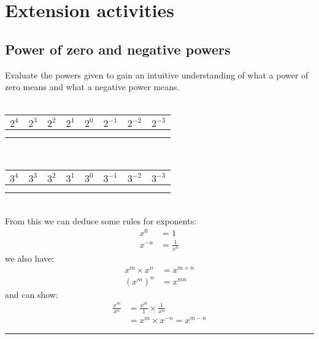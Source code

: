\documentclass[a4paper,12pt]{article}
\renewcommand{\arraystretch}{1.5}
\newcommand\questionend{
	\rule[0pt]{17cm}{0.5pt}\vspace{-0.5cm}\\
}
\begin{document}
	\section*{Extension activities}
	\subsection*{Power of zero and negative powers}
	Evaluate the powers given to gain an intuitive understanding of what a power of zero means and what a negative power means.\\\\
	\renewcommand{\arraystretch}{1.5}
		\begin{tabular}{*{8}{|C{1.75cm}}|}\hline
		$2^4$&$2^3$&$2^2$&$2^1$&$2^0$&$2^{-1}$&$2^{-2}$&$2^{-3}$\\\hline
		& & & & & & &  \\
		& & & & & & &  \\\hline
	\end{tabular}\vspace{1cm}\\
	
	\begin{tabular}{*{8}{|C{1.75cm}}|}\hline
$3^4$&$3^3$&$3^2$&$3^1$&$3^0$&$3^{-1}$&$3^{-2}$&$3^{-3}$\\\hline
& & & & & & &  \\
	& & & & & & &  \\\hline
\end{tabular}\vspace{0.5cm}\\

From this we can deduce some rules for exponents:
\begin{align*}
x^0 &= 1\\
x^{-n}& = \frac{1}{x^n}
\end{align*}
we also have:
\begin{align*}
	x^m\times x^n &= x^{m+n}\\
	(x^m)^n &= x^{mn}
\end{align*}
and can show:
\begin{align*}
	\frac{x^m}{x^n}&=\frac{x^m}{1} \times \frac{1}{x^n} \\
	&=x^m \times x^{-n} = x^{m-n}
\end{align*}
\questionend
\newpage
\end{document}
